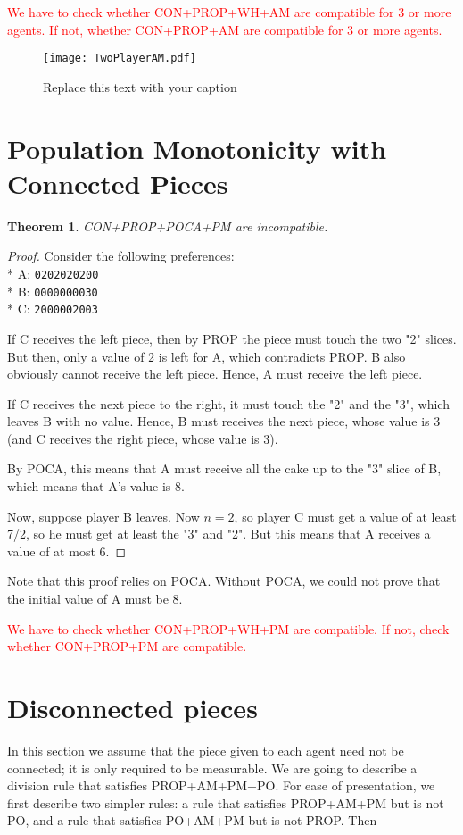 \documentclass[a4paper,12pt]{article}
\newcommand{\triexample}[3]{ \\
* \hspace{1cm}   A: \texttt{#1} \\
* \hspace{1cm}   B: \texttt{#2} \\
* \hspace{1cm}   C: \texttt{#3}
}
\newtheorem{thm}{Theorem}[section]
\begin{document}
\textcolor{red}{
We have to check whether CON+PROP+WH+AM are compatible for 3 or more agents.
If not, whether CON+PROP+AM are compatible for 3 or more agents.
}


\begin{figure}[h!]
\begin{center}
\texttt{[image: TwoPlayerAM.pdf]}
\caption{Replace this text with your caption%
}
\end{center}
\end{figure}

\section{Population Monotonicity with Connected Pieces}

\begin{thm}
CON+PROP+POCA+PM are incompatible.
\end{thm}

\begin{proof}
Consider the following preferences:
\triexample{0202020200}{0000000030}{2000002003}
If C receives the left piece, then by PROP the piece must touch the two "2" slices.
But then, only a value of 2 is left for A, which contradicts PROP.
B also obviously cannot receive the left piece.
Hence, A must receive the left piece.

If C receives the next piece to the right, it must touch the "2" and the "3", which leaves B with no value. Hence, B must receives the next piece, whose value is 3 (and C receives the right piece, whose value is 3).

By POCA, this means that A must receive all the cake up to the "3" slice of B, which means that A's value is 8.

Now, suppose player B leaves. Now $n=2$, so player C must get a value of at least 7/2, so he must get at least the "3" and "2". But this means that A receives a value of at most 6.
\end{proof}

Note that this proof relies on POCA. Without POCA, we could not prove that the initial value of A must be 8.

\textcolor{red}{
We have to check whether CON+PROP+WH+PM are compatible.
If not, check whether    CON+PROP+PM are compatible.
}




\section{Disconnected pieces}
In this section we assume that the piece given to each agent need not be connected; it is only required to be measurable. We are going to describe a division rule that satisfies PROP+AM+PM+PO. For ease of presentation, we first describe two simpler rules: a rule that satisfies PROP+AM+PM but is not PO, and a rule that satisfies PO+AM+PM but is not PROP. Then
\end{document}
